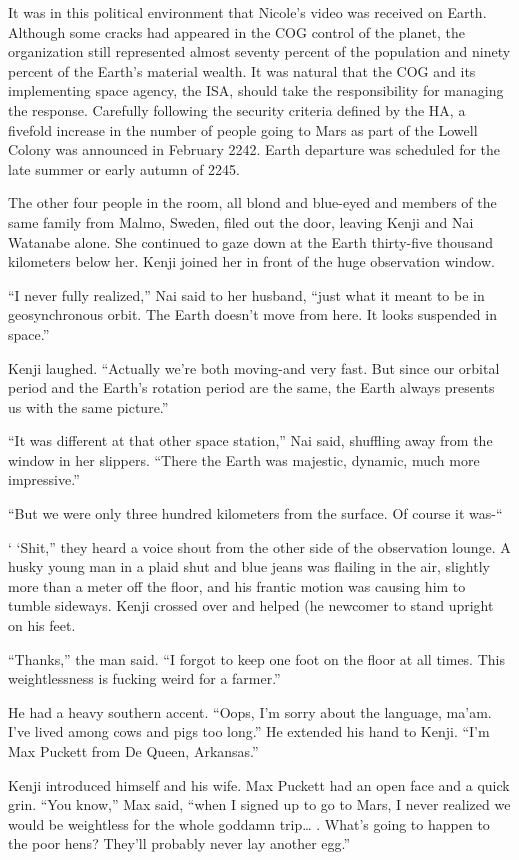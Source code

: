 \documentclass[]{article}
\begin{document}
{It was in this political environment that Nicole’s video was received on Earth. Although some cracks had appeared in the COG control of the planet, the organization still represented almost seventy percent of the population and ninety percent of the Earth’s material wealth. It was natural that the COG and its implementing space agency, the ISA, should take the responsibility for managing the response. Carefully following the security criteria defined by the HA, a fivefold increase in the number of people going to Mars as part of the Lowell Colony was announced in February 2242. Earth departure was scheduled for the late summer or early autumn of 2245.

The other four people in the room, all blond and blue-eyed and members of the same family from Malmo, Sweden, filed out the door, leaving Kenji and Nai Watanabe alone. She continued to gaze down at the Earth thirty-five thousand kilometers below her. Kenji joined her in front of the huge observation window.

“I never fully realized,” Nai said to her husband, “just what it meant to be in geosynchronous orbit. The Earth doesn’t move from here. It looks suspended in space.”

Kenji laughed. “Actually we’re both moving-and very fast. But since our orbital period and the Earth’s rotation period are the same, the Earth always presents us with the same picture.”

“It was different at that other space station,” Nai said, shuffling away from the window in her slippers. “There the Earth was majestic, dynamic, much more impressive.”

“But we were only three hundred kilometers from the surface. Of course it was-“

‘ ‘Shit,” they heard a voice shout from the other side of the observation lounge. A husky young man in a plaid shut and blue jeans was flailing in the air, slightly more than a meter off the floor, and his frantic motion was causing him to tumble sideways. Kenji crossed over and helped (he newcomer to stand upright on his feet.

“Thanks,” the man said. “I forgot to keep one foot on the floor at all times. This weightlessness is fucking weird for a farmer.”

He had a heavy southern accent. “Oops, I’m sorry about the language, ma’am. I’ve lived among cows and pigs too long.” He extended his hand to Kenji. “I’m Max Puckett from De Queen, Arkansas.”

Kenji introduced himself and his wife. Max Puckett had an open face and a quick grin. “You know,” Max said, “when I signed up to go to Mars, I never realized we would be weightless for the whole goddamn trip… . What’s going to happen to the poor hens? They’ll probably never lay another egg.”

}
\end{document}
